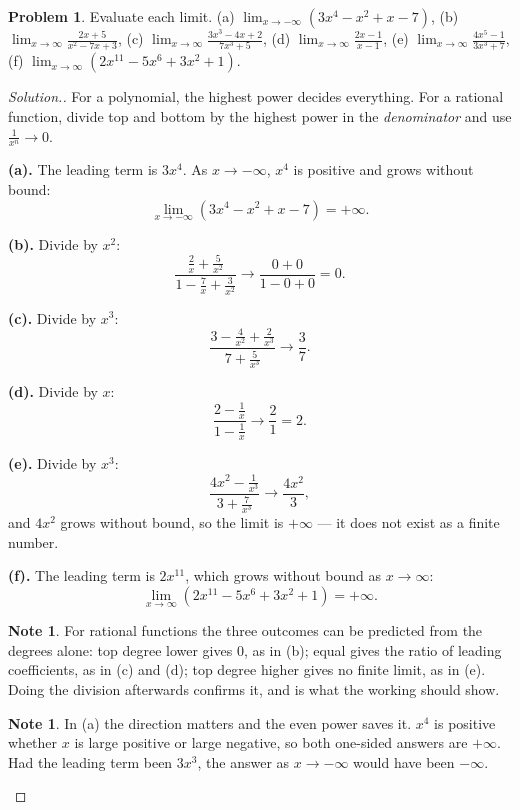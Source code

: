 \documentclass[11pt,a4paper]{article}
\theoremstyle{definition}
\newtheorem{note}[thm]{Note}
\newtheorem{problemx}{Problem}[section]
\newenvironment{problem}{\begin{problemx}}{\end{problemx}}
\newenvironment{solution}
  {\renewcommand{\qedsymbol}{}\begin{proof}[\textit{Solution}.]}
  {\end{proof}}
\begin{document}
\begin{problem}
Evaluate each limit.
\quad (a) $\lim_{x\to-\infty}\left(3x^4-x^2+x-7\right)$, \quad
(b) $\lim_{x\to\infty}\frac{2x+5}{x^2-7x+3}$, \quad
(c) $\lim_{x\to\infty}\frac{3x^3-4x+2}{7x^3+5}$, \quad
(d) $\lim_{x\to\infty}\frac{2x-1}{x-1}$, \quad
(e) $\lim_{x\to\infty}\frac{4x^5-1}{3x^3+7}$, \quad
(f) $\lim_{x\to\infty}\left(2x^{11}-5x^6+3x^2+1\right)$.
\end{problem}

\begin{solution}
For a polynomial, the highest power decides everything. For a rational function, divide
top and bottom by the highest power in the \emph{denominator} and use
$\frac{1}{x^n}\to 0$.

\textbf{(a).} The leading term is $3x^4$. As $x\to-\infty$, $x^4$ is positive and grows
without bound:
$$\lim_{x\to-\infty}\left(3x^4-x^2+x-7\right)=+\infty.$$

\textbf{(b).} Divide by $x^2$:
$$\frac{\frac{2}{x}+\frac{5}{x^2}}{1-\frac{7}{x}+\frac{3}{x^2}}
\longrightarrow\frac{0+0}{1-0+0}=0.$$

\textbf{(c).} Divide by $x^3$:
$$\frac{3-\frac{4}{x^2}+\frac{2}{x^3}}{7+\frac{5}{x^3}}\longrightarrow\frac{3}{7}.$$

\textbf{(d).} Divide by $x$:
$$\frac{2-\frac{1}{x}}{1-\frac{1}{x}}\longrightarrow\frac{2}{1}=2.$$

\textbf{(e).} Divide by $x^3$:
$$\frac{4x^2-\frac{1}{x^3}}{3+\frac{7}{x^3}}\longrightarrow\frac{4x^2}{3},$$
and $4x^2$ grows without bound, so the limit is $+\infty$ --- it does not exist as a
finite number.

\textbf{(f).} The leading term is $2x^{11}$, which grows without bound as
$x\to\infty$:
$$\lim_{x\to\infty}\left(2x^{11}-5x^6+3x^2+1\right)=+\infty.$$

\begin{note}
For rational functions the three outcomes can be predicted from the degrees alone:
top degree lower gives $0$, as in (b); equal gives the ratio of leading coefficients, as
in (c) and (d); top degree higher gives no finite limit, as in (e). Doing the division
afterwards confirms it, and is what the working should show.
\end{note}

\begin{note}
In (a) the direction matters and the even power saves it. $x^4$ is positive whether $x$
is large positive or large negative, so both one-sided answers are $+\infty$. Had the
leading term been $3x^3$, the answer as $x\to-\infty$ would have been $-\infty$.
\end{note}
\end{solution}
\end{document}

